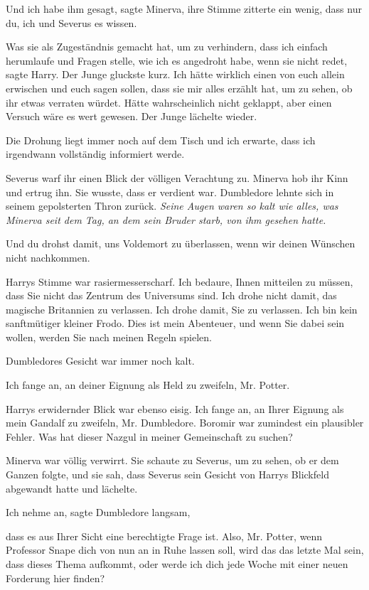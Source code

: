 \glqq{}Und ich habe ihm gesagt\grqq{}, sagte Minerva, ihre Stimme zitterte ein
wenig, \glqq{}dass nur du, ich und Severus es wissen.\grqq{}

\glqq{}Was sie als Zugeständnis gemacht hat, um zu verhindern, dass ich einfach
herumlaufe und Fragen stelle, wie ich es angedroht habe, wenn sie nicht
redet\grqq{}, sagte Harry. Der Junge gluckste kurz. \glqq{}Ich hätte wirklich
einen von euch allein erwischen und euch sagen sollen, dass sie mir alles
erzählt hat, um zu sehen, ob ihr etwas verraten würdet. Hätte wahrscheinlich
nicht geklappt, aber einen Versuch wäre es wert gewesen.\grqq{} Der Junge
lächelte wieder.

\glqq{}Die Drohung liegt immer noch auf dem Tisch und ich erwarte, dass ich
irgendwann vollständig informiert werde.\grqq{}

Severus warf ihr einen Blick der völligen Verachtung zu. Minerva hob ihr Kinn
und ertrug ihn. Sie wusste, dass er verdient war. Dumbledore lehnte sich in
seinem gepolsterten Thron zurück. \emph{Seine Augen waren so kalt wie alles, was
Minerva seit dem Tag, an dem sein Bruder starb, von ihm gesehen hatte.}

\glqq{}Und du drohst damit, uns Voldemort zu überlassen, wenn wir deinen Wünschen
nicht nachkommen.\grqq{}

Harrys Stimme war rasiermesserscharf. \glqq{}Ich bedaure, Ihnen mitteilen zu
müssen, dass Sie nicht das Zentrum des Universums sind. Ich drohe nicht damit,
das magische Britannien zu verlassen. Ich drohe damit, Sie zu verlassen. Ich bin
kein sanftmütiger kleiner Frodo. Dies ist mein Abenteuer, und wenn Sie dabei
sein wollen, werden Sie nach meinen Regeln spielen.\grqq{}

Dumbledores Gesicht war immer noch kalt.

\glqq{}Ich fange an, an deiner Eignung als Held zu zweifeln, Mr. Potter.\grqq{}

Harrys erwidernder Blick war ebenso eisig. \glqq{}Ich fange an, an Ihrer Eignung
als mein Gandalf zu zweifeln, Mr. Dumbledore. Boromir war zumindest ein
plausibler Fehler. Was hat dieser Nazgul in meiner Gemeinschaft zu
suchen?\grqq{}

Minerva war völlig verwirrt. Sie schaute zu Severus, um zu sehen, ob er dem
Ganzen folgte, und sie sah, dass Severus sein Gesicht von Harrys Blickfeld
abgewandt hatte und lächelte.

\glqq{}Ich nehme an\grqq{}, sagte Dumbledore langsam,

\glqq{}dass es aus Ihrer Sicht eine berechtigte Frage ist. Also, Mr. Potter, wenn
Professor Snape dich von nun an in Ruhe lassen soll, wird das das letzte Mal
sein, dass dieses Thema aufkommt, oder werde ich dich jede Woche mit einer neuen
Forderung hier finden?\grqq{}

